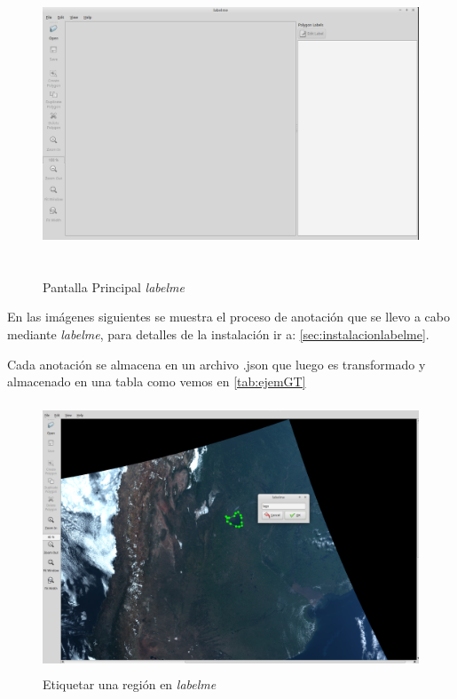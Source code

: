\begin{figure}[h]
 \centering
  \includegraphics[height=9cm,keepaspectratio=true,clip=true]{imagenes/Logos/labelme.png}
  \caption{Pantalla Principal \textit{labelme}}
	\label{Fig: labelme}
\end{figure}

En las imágenes siguientes se muestra el proceso de anotación que se llevo a cabo mediante \textit{labelme}, para detalles de la instalación ir a: \ref{sec:instalacionlabelme}.

Cada anotación se almacena en un archivo .json que luego es transformado y almacenado en una tabla como vemos en \ref{tab:ejemGT}
\begin{figure}[h]
 \centering
  \includegraphics[height=8cm,keepaspectratio=true,clip=true]{imagenes/Logos/labelme1.png}
  \caption{Etiquetar una región en \textit{labelme}}
	\label{Fig: labelme1}
\end{figure}

